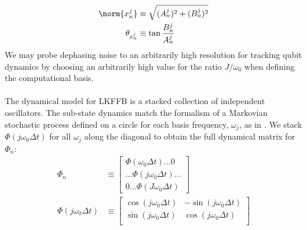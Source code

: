\begin{align}
\norm{x^j_n} & \equiv \sqrt{(A^j_{n})^2 + (B^j_{n})^2} \\
\theta_{x^j_n} & \equiv \tan{\frac{B^j_{n}}{A^j_{n}}}
\end{align}
We may probe dephasing noise to an arbitrarily high resolution for tracking qubit dynamics by choosing an arbitrarily high value for the ratio $J/\omega_0$ when defining the computational basis.
\\
\\
The dynamical model for LKFFB is a stacked collection of independent oscillators. The sub-state dynamics match the formalism of a Markovian stochastic process defined on a circle for each basis frequency, $\omega_j$, as in \cite{karlin2012first}. We stack $\Phi(j \omega_0 \Delta t) $ for all $\omega_j$ along the diagonal to obtain the full dynamical matrix for $\Phi_n$:
\begin{align}
\Phi_{n} & \equiv \begin{bmatrix} 
\Phi(\omega_0 \Delta t)\hdots 0  \\ 
 \hdots \Phi(j\omega_0 \Delta t) \hdots \\
0 \hdots \Phi(J \omega_0 \Delta t)  \end{bmatrix}\\ 
\Phi(j \omega_0 \Delta t) &\equiv \begin{bmatrix} \cos(j \omega_0 \Delta t) & -\sin(j \omega_0 \Delta t) \\ \sin(j \omega_0 \Delta t) & \cos(j \omega_0 \Delta t) \\ \end{bmatrix} \label{eqn:ap_approxSP:LKFFB_Phi} 
\end{align}

